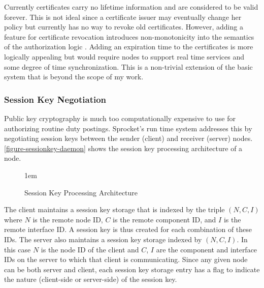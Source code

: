 Currently certificates carry no lifetime information and are considered to be valid forever.
This is not ideal since a certificate issuer may eventually change her policy but currently has
no way to revoke old certificates. However, adding a feature for certificate revocation
introduces non-monotonicity into the semantics of the authorization logic
\cite{Li01nonmonotonicity,Rivest:1998:WEC:647502.728327}. Adding an expiration time to the
certificates is more logically appealing but would require nodes to support real time services
and some degree of time synchronization. This is a non-trivial extension of the basic system
that is beyond the scope of my work.

\subsubsection{Session Key Negotiation}

Public key cryptography is much too computationally expensive to use for authorizing routine
duty postings. Sprocket's run time system addresses this by negotiating session keys between the
sender (client) and receiver (server) nodes. \autoref{figure-sessionkey-daemon} shows the
session key processing architecture of a node.

\begin{figure}[htbp]
  
  \centerline{\raise 1em\box\graph}
  \caption{Session Key Processing Architecture}
  \label{figure-sessionkey-daemon}
\end{figure}

The client maintains a session key storage that is indexed by the triple $(N, C, I)$ where $N$
is the remote node ID, $C$ is the remote component ID, and $I$ is the remote interface ID. A
session key is thus created for each combination of these IDs. The server also maintains a
session key storage indexed by $(N, C, I)$. In this case $N$ is the node ID of the client and
$C$, $I$ are the component and interface IDs on the server to which that client is
communicating. Since any given node can be both server and client, each session key storage
entry has a flag to indicate the nature (client-side or server-side) of the session key.

%

